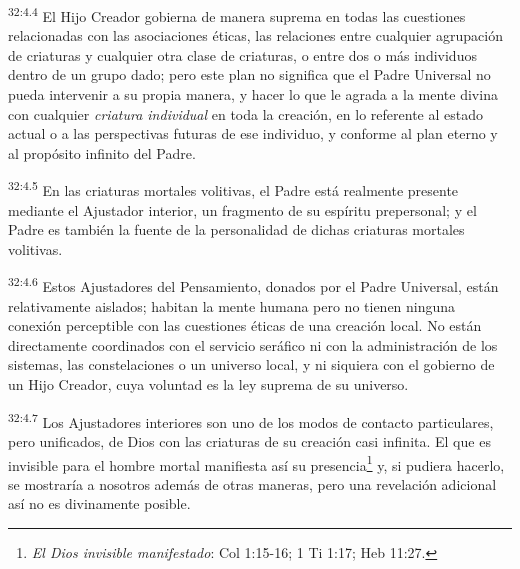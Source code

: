 \par
\textsuperscript{32:4.4} El Hijo Creador gobierna de manera suprema en todas las cuestiones relacionadas con las asociaciones éticas, las relaciones entre cualquier agrupación de criaturas y cualquier otra clase de criaturas, o entre dos o más individuos dentro de un grupo dado; pero este plan no significa que el Padre Universal no pueda intervenir a su propia manera, y hacer lo que le agrada a la mente divina con cualquier \textit{criatura individual} en toda la creación, en lo referente al estado actual o a las perspectivas futuras de ese individuo, y conforme al plan eterno y al propósito infinito del Padre.

\par
\textsuperscript{32:4.5} En las criaturas mortales volitivas, el Padre está realmente presente mediante el Ajustador interior, un fragmento de su espíritu prepersonal; y el Padre es también la fuente de la personalidad de dichas criaturas mortales volitivas.

\par
\textsuperscript{32:4.6} Estos Ajustadores del Pensamiento, donados por el Padre Universal, están relativamente aislados; habitan la mente humana pero no tienen ninguna conexión perceptible con las cuestiones éticas de una creación local. No están directamente coordinados con el servicio seráfico ni con la administración de los sistemas, las constelaciones o un universo local, y ni siquiera con el gobierno de un Hijo Creador, cuya voluntad es la ley suprema de su universo.

\par
\textsuperscript{32:4.7} Los Ajustadores interiores son uno de los modos de contacto particulares, pero unificados, de Dios con las criaturas de su creación casi infinita. El que es invisible para el hombre mortal manifiesta así su presencia\footnote{\textit{El Dios invisible manifestado}: Col 1:15-16; 1 Ti 1:17; Heb 11:27.} y, si pudiera hacerlo, se mostraría a nosotros además de otras maneras, pero una revelación adicional así no es divinamente posible.

